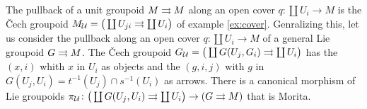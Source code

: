 \begin{example}\label{ex:cech}
The pullback of a unit groupoid $M\rightrightarrows M$ along an open cover $q\colon \coprod U_i \to M$ is the \v Cech groupoid
\( M_\mathcal U = \big( \coprod U_{ji}\rightrightarrows \coprod U_i \big) \)
of example \ref{ex:cover}.
Genralizing this, let us consider the pullback along an open cover $q\colon \coprod U_i \to M$ of a general Lie groupoid $G\rightrightarrows M$.
The \v Cech groupoid
\( G_\mathcal U = \big( \coprod G(U_j,G_i)\rightrightarrows \coprod U_i \big) \)
has the $(x,i)$ whith $x$ in $U_i$ as objects and the $(g,i,j)$ with $g$ in $G(U_j,U_i) = t^{-1}(U_j)\cap s^{-1}(U_i)$ as arrows.
There is a canonical morphism of Lie groupoids
\( \pi_\mathcal U\colon \big( \coprod G(U_j,U_i) \rightrightarrows \coprod U_i \big) \to (G \rightrightarrows M) \)
that is Morita.
\end{example}
